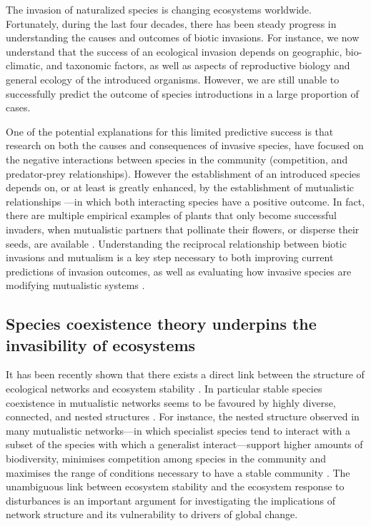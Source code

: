 \documentclass[a4paper]{article}
\begin{document}
The invasion of naturalized species is changing ecosystems worldwide.
Fortunately, during the last four decades, there has been steady progress in understanding the causes and outcomes of biotic invasions.
For instance, we now understand that the success of an ecological invasion depends on geographic, bio-climatic, and taxonomic factors, as well as aspects of reproductive biology and general ecology of the introduced organisms.
However, we are still unable to successfully predict the outcome of species introductions in a large proportion of cases.

One of the potential explanations for this limited predictive success is that research on both the causes and consequences of invasive species, have focused on the negative interactions between species in the community (competition, and predator-prey relationships).
However the establishment of an introduced species depends on, or at least is greatly enhanced, by the establishment of  mutualistic relationships \autocite{Richardson2000}---in which both interacting species have a positive outcome.
In fact, there are multiple empirical examples of plants that only become successful invaders, when mutualistic partners that pollinate their flowers, or disperse their seeds, are available \autocite{Simberloff1999, Simberloff2006, Prior2014}.
Understanding the reciprocal relationship between biotic invasions and mutualism is a key step necessary to both improving current predictions of invasion outcomes, as well as evaluating how invasive species are modifying mutualistic systems \autocite{Richardson2000}.

\subsection{Species coexistence theory underpins the invasibility of ecosystems}

It has been recently shown that there exists a direct link between the structure of ecological networks and ecosystem stability \autocite{Bascompte2006,Rooney2006,Okuyama2008,Bastolla2009, Tylianakis2010, Thebault2010,Rohr2014,Sauve2014}.
In particular stable species coexistence in mutualistic networks seems to be favoured by highly diverse, connected, and nested structures \autocite{Okuyama2008, Bastolla2009, Thebault2010, Sauve2014}.
For instance, the nested structure observed in many mutualistic networks---in which specialist species tend to interact with a subset of the species with which a generalist interact---support higher amounts of biodiversity, minimises competition among species in the community and maximises the range of conditions necessary to have a stable community \autocite{Bastolla2009, Rohr2014}.
The unambiguous link between ecosystem stability and the ecosystem response to disturbances is an important argument for investigating the implications of network structure and its vulnerability to drivers of global change.
\end{document}
